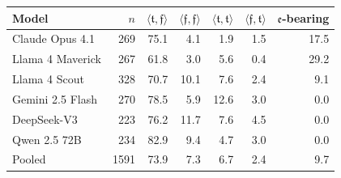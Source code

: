 \begin{tabular}{l@{\quad}r@{\qquad}r@{\quad}r@{\quad}r@{\quad}r@{\quad}r}
\toprule
Model & $n$ & $\langle\mathfrak{t},\mathfrak{f}\rangle$ & $\langle\mathfrak{f},\mathfrak{f}\rangle$ & $\langle\mathfrak{t},\mathfrak{t}\rangle$ & $\langle\mathfrak{f},\mathfrak{t}\rangle$ & $\mathfrak{e}$-bearing \\
\midrule
Claude Opus 4.1 & 269 & 75.1 & 4.1 & 1.9 & 1.5 & 17.5 \\
Llama 4 Maverick & 267 & 61.8 & 3.0 & 5.6 & 0.4 & 29.2 \\
Llama 4 Scout & 328 & 70.7 & 10.1 & 7.6 & 2.4 & 9.1 \\
Gemini 2.5 Flash & 270 & 78.5 & 5.9 & 12.6 & 3.0 & 0.0 \\
DeepSeek-V3 & 223 & 76.2 & 11.7 & 7.6 & 4.5 & 0.0 \\
Qwen 2.5 72B & 234 & 82.9 & 9.4 & 4.7 & 3.0 & 0.0 \\
\midrule
Pooled & 1591 & 73.9 & 7.3 & 6.7 & 2.4 & 9.7 \\
\bottomrule
\end{tabular}
